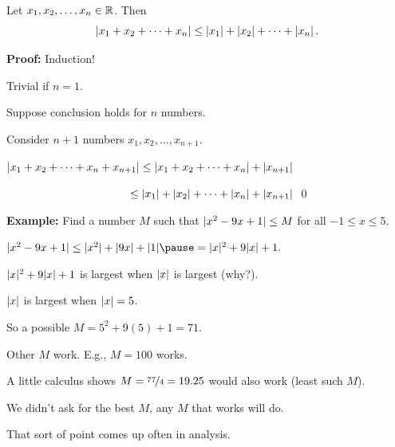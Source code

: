 \documentclass[10pt,aspectratio=149]{beamer}
\begin{document}
\begin{frame}

\begin{corollary}
Let $x_1, x_2, \ldots, x_n \in {\mathbb{R}}$.  Then
\begin{equation*}
\left\lvert {x_1 + x_2 + \cdots + x_n} \right\rvert \leq 
\left\lvert {x_1} \right\rvert + \left\lvert {x_2} \right\rvert + \cdots + \left\lvert {x_n} \right\rvert .
\end{equation*}
\end{corollary}
\pause

\textbf{Proof:}
Induction!

\medskip
\pause

Trivial if $n=1$.

\medskip
\pause

Suppose conclusion holds for $n$ numbers.

\pause
Consider $n+1$ numbers $x_1,x_2,\ldots,x_{n+1}$.

\pause
\medskip

$\displaystyle
\lvert {x_1 + x_2 + \cdots + x_n + x_{n+1}} \rvert \leq 
\lvert {x_1 + x_2 + \cdots + x_n} \rvert + \lvert {x_{n+1}} \rvert$

\medskip
\pause
$\displaystyle
\hspace{1.53in}\leq 
\lvert {x_1} \rvert + \lvert {x_2} \rvert + \cdots + \lvert {x_n} \rvert + \lvert {x_{n+1}} \rvert
$
\qed
\end{frame}

\begin{frame}

\textbf{Example:}
Find a number $M$ such that $\lvert {x^2-9x+1} \rvert \leq M$ for all $-1 \leq x \leq
5$.

\pause
\medskip


$
\sabs{x^2-9x+1} \leq \sabs{x^2}+\sabs{9x}+\sabs{1}
\pause
=
\sabs{x}^2+9\sabs{x}+1 .
$

\medskip
\pause

$\lvert {x} \rvert^2+9\lvert {x} \rvert+1$ is largest when $\left\lvert {x} \right\rvert$ is largest (why?).

\medskip
\pause

$\left\lvert {x} \right\rvert$ is largest when $\left\lvert {x} \right\rvert=5$.

\medskip
\pause

So a possible $M = 5^2+9(5)+1 = 71$.

\medskip
\pause

Other $M$ work.  E.g., $M=100$ works.

\pause
A little calculus shows $M=\nicefrac{77}{4}=19.25$ would also work (least such $M$).

\medskip
\pause

We didn't ask for the best $M$, any $M$ that works will do.

\medskip
\pause

That sort of point comes up often in analysis.

\end{frame}
\end{document}
